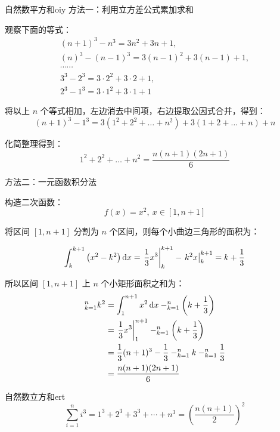 \documentclass[12pt, cn]{elegantart}
\begin{document}
\begin{definition}{自然数平方和}{oiy}
 方法一：利用立方差公式累加求和

观察下面的等式：
$$\begin{array}{l}
{(n+1)^{3}-n^{3}=3 n^{2}+3 n+1}, \\ {(n)^{3}-(n-1)^{3}=3(n-1)^{2}+3(n-1)+1}, \\ {\cdots \cdots} \\ {3^{3}-2^{3}=3 \cdot 2^{2}+3 \cdot 2+1}, \\ {2^{3}-1^{3}=3 \cdot 1^{2}+3 \cdot 1+1}
\end{array}$$

将以上 $n$ 个等式相加，左边消去中间项，右边提取公因式合并，得到：
$$
(n+1)^{3}-1^{3}=3\left(1^{2}+2^{2}+\dots+n^{2}\right)+3(1+2+\dots+n)+n
$$

化简整理得到：
$$
1^{2}+2^{2}+\dots+n^{2}=\frac{n(n+1)(2 n+1)}{6}
$$

\hdashrule{\linewidth}{0.5pt}{3pt}

 方法二：一元函数积分法

构造二次函数：
$$f(x)=x^2,\ x \in[1, n+1]$$

将区间 $[1, n+1]$ 分割为 $n$ 个区间，则每个小曲边三角形的面积为：

$$
\int_{k}^{k+1}\left(x^{2}-k^{2}\right) \mathop{}\!\mathrm{d} x=\left.\frac{1}{3} x^{3}\right|_{k} ^{k+1}-\left.k^{2} x\right|_{k} ^{k+1}=k+\frac{1}{3}
$$

所以区间 $[1, n+1]$ 上 $n$ 个小矩形面积之和为：
\begin{align*}
   \relax_{k=1}^{n} k^{2}&=\int_{1}^{n+1} x^{2} \mathop{}\!\mathrm{d} x-\relax_{k=1}^{n}\left(k+\frac{1}{3}\right)\\
   &=\left.\frac{1}{3} x^{3}\right|_{1} ^{n+1}-\relax_{k=1}^{n}\left(k+\frac{1}{3}\right)\\
   &=\frac{1}{3}(n+1)^{3}-\frac{1}{3}-\relax_{k=1}^{n} k-\relax_{k=1}^{n} \frac{1}{3}\\
   &=\frac{n(n+1)(2 n+1)}{6}
   \end{align*}
\end{definition}


\begin{theorem}{自然数立方和}{ert}
\begin{equation}
     \sum_{i=1}^{n} i^{3}=1^3+2^3+3^3+\cdots+n^3=\left(\frac{n(n+1)}{2}\right)^{2}
\end{equation}
\end{theorem}
\end{document}

